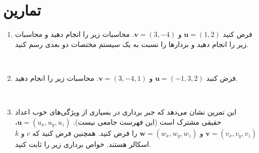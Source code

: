 \section{\textbf{تمارین}}
{
    \Large
    \begin{spacing}{1.5}
        \begin{enumerate}
            \item {فرض کنید $\textbf{u}=(1,2)$ و $\textbf{v}=(3,-4)$. محاسبات زیر را انجام دهید و محاسبات زیر را انجام دهید و بردارها را نسبت به یک سیستم مختصات دو بعدی رسم کنید.}
            \begin{flushleft}
            \end{flushleft}
            \\
            \item {فرض کنید $\textbf{u}=(-1,3,2)$ و $\textbf{v}=(3,-4,1)$. محاسبات زیر را انجام دهید.}
            \begin{flushleft}
            \end{flushleft}
            \\
            \item {این تمرین نشان می‌دهد که جبر برداری در بسیاری از ویژگی‌های خوب اعداد حقیقی مشترک است (این فهرست جامعی نیست).
                $\textbf{u}=(u_{x},u_{y},u_{z})$، $\textbf{v}=(v_{x},v_{y},v_{z})$ و $\textbf{w}=(w_{x},w_{y},w_{z})$ را فرض کنید. همچنین فرض کنید که $c$ و $k$ اسکالر هستند. خواص برداری زیر را ثابت کنید.}
            \begin{flushleft}
\end{flushleft}
\end{enumerate}
\end{spacing}}
